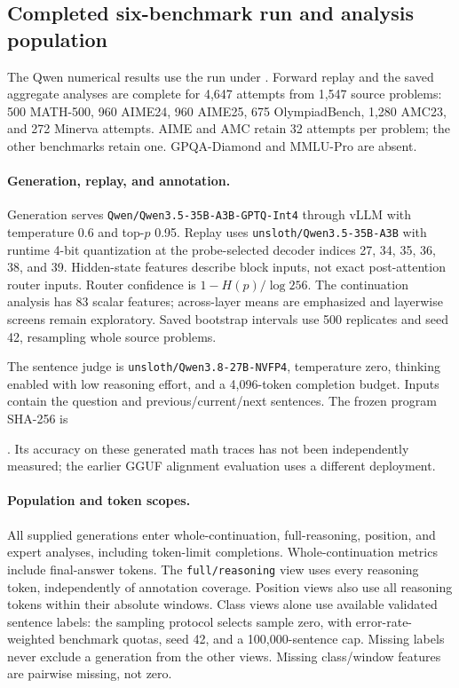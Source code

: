 \subsection{Completed six-benchmark run and analysis population}
\label{sec:qwen-corr-audit}

The Qwen numerical results use the run
under . Forward replay
and the saved aggregate analyses are complete for 4,647 attempts from 1,547 source
problems: 500 MATH-500, 960 AIME24, 960 AIME25, 675 OlympiadBench, 1,280 AMC23,
and 272 Minerva attempts. AIME and AMC retain 32 attempts per problem;
the other benchmarks retain one. GPQA-Diamond and MMLU-Pro are absent.

\paragraph{Generation, replay, and annotation.}
Generation serves \texttt{Qwen/Qwen3.5-35B-A3B-GPTQ-Int4} through vLLM with
temperature 0.6 and top-$p$ 0.95. Replay uses
\texttt{unsloth/Qwen3.5-35B-A3B} with runtime 4-bit quantization at the
probe-selected decoder indices 27, 34, 35, 36, 38, and 39.
Hidden-state features describe block inputs, not exact post-attention router
inputs. Router confidence is $1-H(p)/\log 256$. The continuation analysis
has 83 scalar features; across-layer means are emphasized and layerwise
screens remain exploratory. Saved bootstrap intervals use 500 replicates
and seed 42, resampling whole source problems.

The sentence judge is \texttt{unsloth/Qwen3.8-27B-NVFP4}, temperature zero,
thinking enabled with low reasoning effort, and a 4,096-token completion
budget. Inputs contain the question and previous/current/next sentences.
The frozen program SHA-256 is\par\noindent
{}.
Its accuracy on these generated math traces has not been independently
measured; the earlier GGUF alignment evaluation uses a different deployment.

\paragraph{Population and token scopes.}
All supplied generations enter whole-continuation, full-reasoning, position,
and expert analyses, including token-limit completions. Whole-continuation
metrics include final-answer tokens. The \texttt{full/reasoning} view
uses every reasoning token, independently of annotation coverage. Position
views also use all reasoning tokens within their absolute windows. Class
views alone use available validated sentence labels: the sampling protocol
selects sample zero, with error-rate-weighted benchmark quotas, seed 42,
and a 100,000-sentence cap. Missing labels never exclude a generation from
the other views. Missing class/window features are pairwise missing, not zero.

